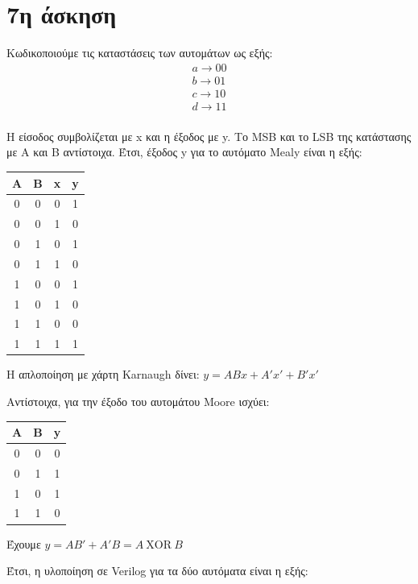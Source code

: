 \documentclass[a4paper]{article}
\begin{document}
\section*{7η άσκηση}

Κωδικοποιούμε τις καταστάσεις των αυτομάτων ως εξής:
\begin{align*}
	a \rightarrow 00 \\
	b \rightarrow 01 \\
	c \rightarrow 10 \\
	d \rightarrow 11 \\
\end{align*}

H είσοδος συμβολίζεται με x και η έξοδος με y.
Το MSB και το LSB της κατάστασης με A και B αντίστοιχα.
Έτσι, έξοδος y για το αυτόματο Mealy είναι η εξής:

\begin{center}
	\begin{tabular}{|c|c|c||c|}
		\hline
		A & B & x & y \\
		\hline
		0 & 0 & 0 & 1 \\
		\hline
		0 & 0 & 1 & 0 \\
		\hline
		0 & 1 & 0 & 1 \\
		\hline
		0 & 1 & 1 & 0 \\
		\hline
		1 & 0 & 0 & 1 \\
		\hline
		1 & 0 & 1 & 0 \\
		\hline
		1 & 1 & 0 & 0 \\
		\hline
		1 & 1 & 1 & 1 \\
		\hline
	\end{tabular}
\end{center}

H απλοποίηση με χάρτη Karnaugh δίνει: $ y = ABx+A'x'+B'x' $

Αντίστοιχα, για την έξοδο του αυτομάτου Moore ισχύει:

\begin{center}
	\begin{tabular}{|c|c||c|}
	\hline
	A & B & y \\
	\hline
	0 & 0 & 0 \\
	\hline
	0 & 1 & 1 \\
	\hline
	1 & 0 & 1 \\
	\hline
	1 & 1 & 0 \\
	\hline
	\end{tabular}
\end{center}

Έχουμε $ y = AB'+A'B = A \ \text{XOR} \ B $ 

Έτσι, η υλοποίηση σε Verilog για τα δύο αυτόματα είναι η εξής:


\end{document}
